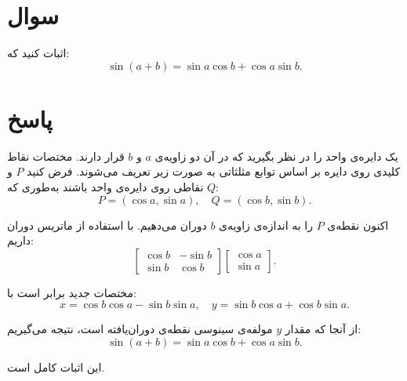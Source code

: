 \documentclass{article}
\begin{document}
\section{سوال}
اثبات کنید که:
\begin{equation}
    \sin(a + b) = \sin a \cos b + \cos a \sin b.
\end{equation}

\section{پاسخ}

یک دایره‌ی واحد را در نظر بگیرید که در آن دو زاویه‌ی $a$ و $b$ قرار دارند. مختصات نقاط کلیدی روی دایره بر اساس توابع مثلثاتی به صورت زیر تعریف می‌شوند. فرض کنید $P$ و $Q$ نقاطی روی دایره‌ی واحد باشند به‌طوری که:
\begin{equation}
    P = (\cos a, \sin a), \quad Q = (\cos b, \sin b).
\end{equation}

اکنون نقطه‌ی $P$ را به اندازه‌ی زاویه‌ی $b$ دوران می‌دهیم. با استفاده از ماتریس دوران داریم:
\begin{equation}
    \begin{bmatrix} \cos b & -\sin b \\ \sin b & \cos b \end{bmatrix} \begin{bmatrix} \cos a \\ \sin a \end{bmatrix}.
\end{equation}

مختصات جدید برابر است با:
\begin{equation}
    x = \cos b \cos a - \sin b \sin a, \quad y = \sin b \cos a + \cos b \sin a.
\end{equation}

از آنجا که مقدار $y$ مولفه‌ی سینوسی نقطه‌ی دوران‌یافته است، نتیجه می‌گیریم:
\begin{equation}
    \sin(a + b) = \sin a \cos b + \cos a \sin b.
\end{equation}

این اثبات کامل است.
\end{document}
